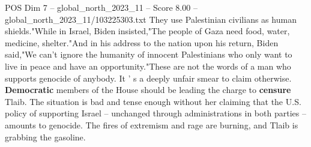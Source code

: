 \begin{textsample}{POS Dim 7 – global\_north\_2023\_11 – Score 8.00 – global\_north\_2023\_11/103225303.txt}
They use Palestinian civilians as human shields."While in Israel, Biden insisted,"The people of Gaza need food, water, medicine, shelter."And in his address to the nation upon his return, Biden said,"We can't ignore the humanity of innocent Palestinians who only want to live in peace and have an opportunity."These are not the words of a man who supports genocide of anybody.
It ' s a deeply unfair smear to claim otherwise. \textbf{Democratic} members of the House should be leading the charge to \textbf{censure} Tlaib.
The situation is bad and tense enough without her claiming that the U.S. policy of supporting Israel -- unchanged through administrations in both parties -- amounts to genocide.
The fires of extremism and rage are burning, and Tlaib is grabbing the gasoline.

\end{textsample}

